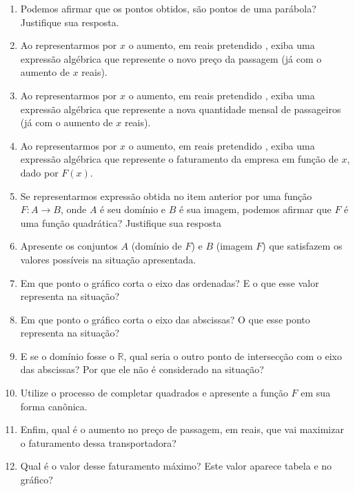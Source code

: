 \documentclass[10 pt,usenames,dvipsnames, oneside]{article}
\begin{document}
\begin{enumerate}
\item {} 
Podemos afirmar que os pontos obtidos, são pontos de uma parábola? Justifique sua resposta.

\item {} 
Ao representarmos por \(x\) o aumento, em reais pretendido , exiba uma expressão algébrica que represente o novo preço da passagem (já com o aumento de \(x\) reais).

\item {} 
Ao representarmos por \(x\) o aumento, em reais pretendido , exiba uma expressão algébrica que represente a nova quantidade mensal de passageiros (já com o aumento de \(x\) reais).

\item {} 
Ao representarmos por \(x\) o aumento, em reais pretendido , exiba uma expressão algébrica que represente o faturamento da empresa em função de \(x\), dado por \(F(x)\).

\item {} 
Se representarmos expressão obtida no item anterior por uma função \(F:A\to B\), onde \(A\) é seu domínio e \(B\) é sua imagem, podemos afirmar que \(F\) é uma função quadrática? Justifique sua resposta

\item {} 
Apresente os conjuntos \(A\) (domínio de \(F\)) e \(B\) (imagem \(F\)) que satisfazem os valores possíveis na situação apresentada.

\item {} 
Em que ponto o gráfico corta o eixo das ordenadas? E o que esse valor representa na situação?

\item {} 
Em que ponto o gráfico corta o eixo das abscissas? O que esse ponto representa na situação?

\item {} 
E se o domínio fosse o \(\mathbb{R}\), qual seria o outro ponto de intersecção com o eixo das abscissas? Por que ele não é considerado na situação?

\item {} 
Utilize o processo de completar quadrados  e apresente a função \(F\) em sua forma canônica.

\item {} 
Enfim, qual é o aumento no preço de passagem, em reais, que vai maximizar o faturamento dessa transportadora?

\item {} 
Qual é o valor desse faturamento máximo? Este valor aparece tabela e no gráfico?

\end{enumerate}
\end{document}
